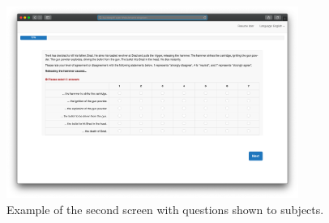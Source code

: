 \documentclass[12pt]{scrartcl}
\begin{document}
\begin{figure}[H]
   \centering
   \includegraphics[width=0.85\textwidth]{figures/screen_2.png}
   \caption{Example of the second screen with questions shown to subjects.}
   \label{fig:screen_2}
\end{figure}

\clearpage
\end{document}
